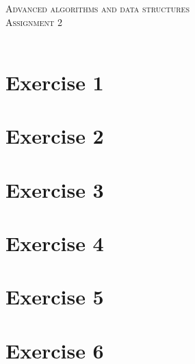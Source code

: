 \documentclass{article}
\begin{document}
\begin{center}
\textsc{\Large Advanced algorithms and data structures}\\[0.5cm]
\textsc{\large Assignment 2}\\[0.5cm]
\textsc{\large }\\[0.5cm]
\vspace{1 cm}
\end{center}

\section*{Exercise 1}


\newpage
\section*{Exercise 2}

\section*{Exercise 3}


\newpage
\section*{Exercise 4}



\newpage
\section*{Exercise 5}

\section*{Exercise 6}

\end{document}

